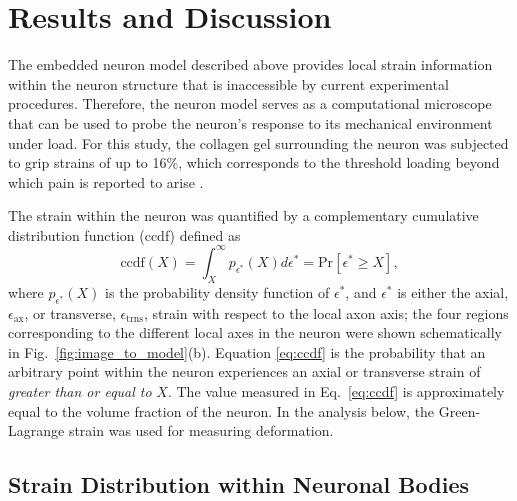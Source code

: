 \documentclass[]{interact}
\begin{document}
\section{Results and Discussion}
\label{sec:results}

The embedded neuron model described above provides local strain information within the neuron structure that is inaccessible by current experimental procedures. Therefore, the neuron model serves as a computational microscope that can be used to probe the  neuron's response to its mechanical environment under load. For this study, the collagen gel surrounding the neuron was subjected to grip strains of up to 16$\%$, which corresponds to the threshold loading beyond which pain is reported to arise \citep{Lee:2004jl,Dong:2012bn,Zhang:2016ga,Ita:Ys0ulxs9,Zhang:2017gr}. 

The strain within the neuron was quantified by a complementary cumulative distribution function (ccdf) defined as 
%
\begin{equation}
\text{ccdf}(X) = \int_{X}^{\infty} p_{\epsilon^*}(X)d\epsilon^* = \text{Pr}[ \epsilon^*\ge X],
\label{eq:ccdf}
\end{equation}
%
where $p_{\epsilon^*}(X)$ is the probability density function of $\epsilon^*$, and $\epsilon^*$ is either the axial, $\epsilon_{\text{ax}}$, or transverse, $\epsilon_{\text{trns}}$, strain with respect to the local axon axis; the four regions corresponding to the different local axes in the neuron were shown schematically in Fig.\ \ref{fig:image_to_model}(b). Equation \ref{eq:ccdf} is the probability that an arbitrary point within the neuron experiences an axial or transverse strain of \textit{greater than or equal to} $X$. The value measured in Eq.\ \eqref{eq:ccdf} is approximately equal to the volume fraction of the neuron. In the analysis below, the Green-Lagrange strain was used for measuring deformation. 

\subsection{Strain Distribution within Neuronal Bodies}
\label{subsec:strain_distribution}
\end{document}
